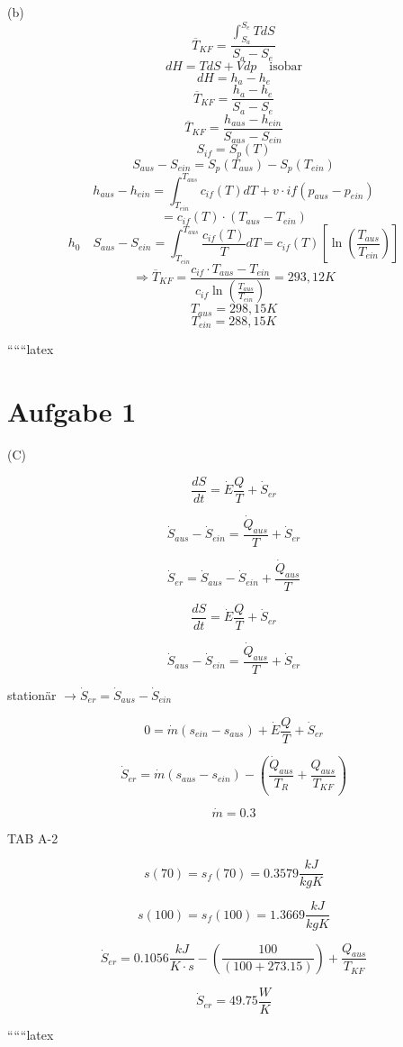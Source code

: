 (b)
\[
\overline{T}_{KF} = \frac{\int_{S_a}^{S_e} T dS}{S_a - S_e}
\]
\[
dH = T dS + V dp \quad \text{isobar}
\]
\[
dH = h_a - h_e
\]
\[
\overline{T}_{KF} = \frac{h_a - h_e}{S_a - S_e}
\]
\[
\overline{T}_{KF} = \frac{h_{aus} - h_{ein}}{S_{aus} - S_{ein}}
\]
\[
S_{if} = S_p(T)
\]
\[
S_{aus} - S_{ein} = S_p(T_{aus}) - S_p(T_{ein})
\]
\[
h_{aus} - h_{ein} = \int_{T_{ein}}^{T_{aus}} c_{if}(T) dT + v \cdot if(p_{aus} - p_{ein})
\]
\[
= c_{if}(T) \cdot (T_{aus} - T_{ein})
\]
\[
h_0 \quad S_{aus} - S_{ein} = \int_{T_{ein}}^{T_{aus}} \frac{c_{if}(T)}{T} dT = c_{if}(T) \left[ \ln \left( \frac{T_{aus}}{T_{ein}} \right) \right]
\]
\[
\Rightarrow \overline{T}_{KF} = \frac{c_{if} \cdot T_{aus} - T_{ein}}{c_{if} \ln \left( \frac{T_{aus}}{T_{ein}} \right)} = 293,12 K
\]
\[
T_{aus} = 298,15 K
\]
\[
T_{ein} = 288,15 K
\]

``````latex


\section*{Aufgabe 1}
(C)

\[
\frac{dS}{dt} = \dot{E} \frac{Q}{T} + \dot{S}_{er}
\]

\[
\dot{S}_{aus} - \dot{S}_{ein} = \frac{\dot{Q}_{aus}}{T} + \dot{S}_{er}
\]

\[
\dot{S}_{er} = \dot{S}_{aus} - \dot{S}_{ein} + \frac{\dot{Q}_{aus}}{T}
\]

\[
\frac{dS}{dt} = \dot{E} \frac{Q}{T} + \dot{S}_{er}
\]

\[
\dot{S}_{aus} - \dot{S}_{ein} = \frac{\dot{Q}_{aus}}{T} + \dot{S}_{er}
\]

stationär $\rightarrow \dot{S}_{er} = \dot{S}_{aus} - \dot{S}_{ein}$

\[
0 = \dot{m} \left( s_{ein} - s_{aus} \right) + \dot{E} \frac{Q}{T} + \dot{S}_{er}
\]

\[
\dot{S}_{er} = \dot{m} \left( s_{aus} - s_{ein} \right) - \left( \frac{\dot{Q}_{aus}}{T_R} + \frac{Q_{aus}}{T_{KF}} \right)
\]

\[
\dot{m} = 0.3
\]

TAB A-2

\[
s(70) = s_f(70) = 0.3579 \frac{kJ}{kgK}
\]

\[
s(100) = s_f(100) = 1.3669 \frac{kJ}{kgK}
\]

\[
\dot{S}_{er} = 0.1056 \frac{kJ}{K \cdot s} - \left( \frac{100}{(100+273.15)} \right) + \frac{Q_{aus}}{T_{KF}}
\]

\[
\dot{S}_{er} = 49.75 \frac{W}{K}
\]

``````latex